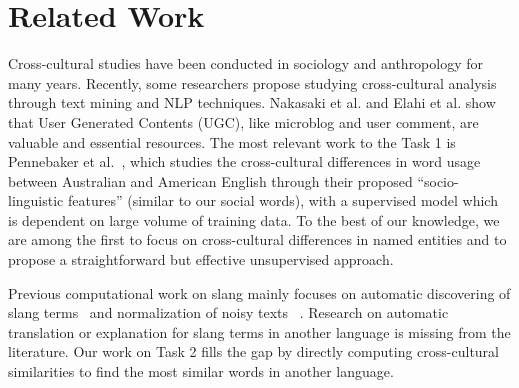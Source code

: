 \vspace{-10pt}
\section{Related Work}
\label{sec:related}
Cross-cultural studies have been conducted in 
sociology and anthropology for many years. 
Recently, some researchers propose 
studying cross-cultural analysis through text mining and NLP techniques.
Nakasaki et al.  and 
Elahi et al.  show that 
User Generated Contents (UGC), like microblog and user comment, 
are valuable and essential resources. 
The most relevant work to the Task 1 is Pennebaker 
et al.~, which studies the cross-cultural 
differences in word usage between Australian and American English through 
their proposed ``socio-linguistic features'' (similar to our social words), with a supervised model which is dependent on large volume of training data. 
To the best of our knowledge, we are among the first to focus on cross-cultural differences in named entities and to propose a straightforward but effective unsupervised approach.

Previous computational work on slang mainly focuses on automatic 
discovering of slang terms~\cite{elsahar2014a} and normalization of noisy texts ~\cite{han2012automatically}. Research on automatic 
translation or explanation for slang terms in another language is missing from the literature. 
Our work on Task 2 fills the gap by directly computing cross-cultural 
similarities to find the most similar words in another language.


